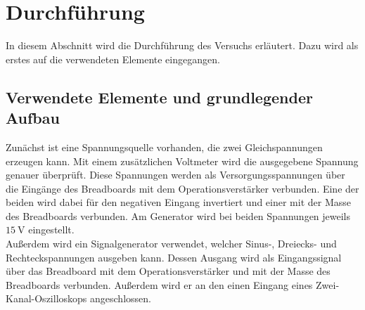 \section{Durchführung}
\label{sec:Durchführung}
In diesem Abschnitt wird die Durchführung des Versuchs erläutert. Dazu wird als erstes auf die verwendeten Elemente eingegangen.
\subsection{Verwendete Elemente und grundlegender Aufbau}
Zunächst ist eine Spannungsquelle vorhanden, die zwei Gleichspannungen erzeugen kann. %
Mit einem zusätzlichen Voltmeter wird die ausgegebene Spannung genauer überprüft. 
Diese Spannungen werden als Versorgungsspannungen über die Eingänge des Breadboards mit dem Operationsverstärker verbunden.
Eine der beiden wird dabei für den negativen Eingang invertiert und einer mit der Masse des Breadboards verbunden. 
Am Generator wird bei beiden Spannungen jeweils $\qty{15}{\volt}$ eingestellt. 
\\ 
Außerdem wird ein Signalgenerator verwendet, welcher Sinus-, Dreiecks- und Rechteckspannungen ausgeben kann. %
Dessen Ausgang wird als Eingangssignal über das Breadboard mit dem Operationsverstärker  und mit der Masse des Breadboards verbunden.
Außerdem wird er an den einen Eingang eines Zwei-Kanal-Oszilloskops angeschlossen. 
